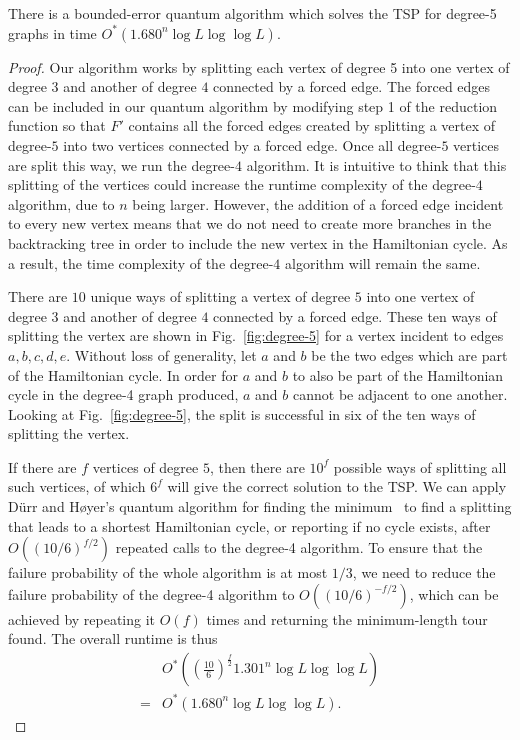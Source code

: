 \begin{theorem}
\label{thm:deg5}
There is a bounded-error quantum algorithm which solves the TSP for degree-5 graphs in time $O^*(1.680^n\log L\log \log L)$.
\end{theorem}

\begin{proof}
Our algorithm works by splitting each vertex of degree 5 into one vertex of degree $3$ and another of degree $4$ connected by a forced edge. The forced edges can be included in our quantum algorithm by modifying step 1 of the reduction function so that $F'$ contains all the forced edges created by splitting a vertex of degree-$5$ into two vertices connected by a forced edge. Once all degree-$5$ vertices are split this way, we run the degree-$4$ algorithm. It is intuitive to think that this splitting of the vertices could increase the runtime complexity of the degree-$4$ algorithm, due to $n$ being larger. However, the addition of a forced edge incident to every new vertex means that we do not need to create more branches in the backtracking tree in order to include the new vertex in the Hamiltonian cycle. As a result, the time complexity of the degree-$4$ algorithm will remain the same.

There are $10$ unique ways of splitting a vertex of degree $5$ into one vertex of degree $3$ and another of degree $4$ connected by a forced edge. These ten ways of splitting the vertex are shown in Fig.\ \ref{fig:degree-5} for a vertex incident to edges $a,b,c,d,e$. Without loss of generality, let $a$ and $b$ be the two edges which are part of the Hamiltonian cycle. In order for $a$ and $b$ to also be part of the Hamiltonian cycle in the degree-4 graph produced, $a$ and $b$ cannot be adjacent to one another. Looking at Fig.\ \ref{fig:degree-5}, the split is successful in six of the ten ways of splitting the vertex.

If there are $f$ vertices of degree $5$, then there are $10^f$ possible ways of splitting all such vertices, of which $6^f$ will give the correct solution to the TSP. We can apply D\"urr and H\o yer's quantum algorithm for finding the minimum~\cite{durr1996} to find a splitting that leads to a shortest Hamiltonian cycle, or reporting if no cycle exists, after $O((10/6)^{f/2})$ repeated calls to the degree-4 algorithm. To ensure that the failure probability of the whole algorithm is at most $1/3$, we need to reduce the failure probability of the degree-4 algorithm to $O((10/6)^{-f/2})$, which can be achieved by repeating it $O(f)$ times and returning the minimum-length tour found. The overall runtime is thus
%
\begin{align*}
&O^*\left(\left(\frac{10}{6}\right)^{\frac{f}{2}}1.301^n\log L \log \log L\right)\\
 = &O^*(1.680^n\log L \log \log L).
\end{align*}
\end{proof}
